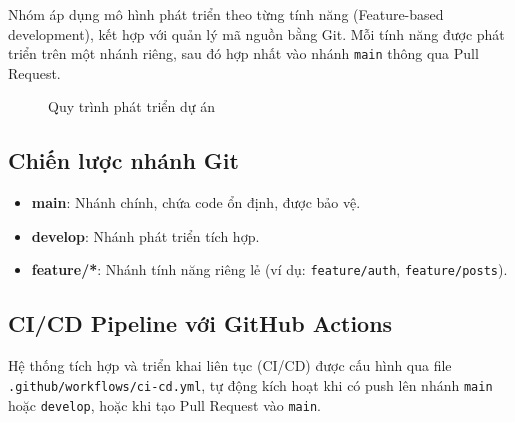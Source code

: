 \documentclass[a4paper]{article}
\begin{document}
Nhóm áp dụng mô hình phát triển theo từng tính năng (Feature-based development), kết hợp với quản lý mã nguồn bằng Git. Mỗi tính năng được phát triển trên một nhánh riêng, sau đó hợp nhất vào nhánh \texttt{main} thông qua Pull Request.

\begin{figure}[h!]
\centering
{}
\caption{Quy trình phát triển dự án}
\end{figure}

\subsection{Chiến lược nhánh Git}

\begin{itemize}
    \item \textbf{main}: Nhánh chính, chứa code ổn định, được bảo vệ.
    \item \textbf{develop}: Nhánh phát triển tích hợp.
    \item \textbf{feature/*}: Nhánh tính năng riêng lẻ (ví dụ: \texttt{feature/auth}, \texttt{feature/posts}).
\end{itemize}

\subsection{CI/CD Pipeline với GitHub Actions}

Hệ thống tích hợp và triển khai liên tục (CI/CD) được cấu hình qua file \texttt{.github/workflows/ci-cd.yml}, tự động kích hoạt khi có push lên nhánh \texttt{main} hoặc \texttt{develop}, hoặc khi tạo Pull Request vào \texttt{main}.
\end{document}
